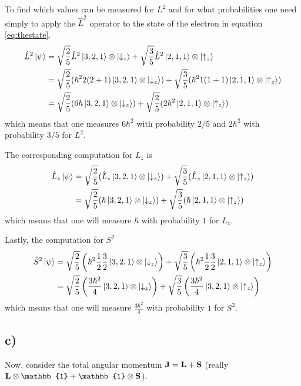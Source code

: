 \documentclass[]{article}
\begin{document}
To find which values can be measured for $L^2$ and for what probabilities one need simply to apply the $\hat{L}^2$ operator to the state of the electron in equation \ref{eq:thestate}.
\begin{align*}
\hat{L}^2\ket{\psi}
&=\sqrt{\frac{2}{5}}\hat{L}^2\ket{3,2,1}\otimes\ket{\downarrow_z}
+ \sqrt{\frac{3}{5}}\hat{L}^2\ket{2,1,1}\otimes\ket{\uparrow_z} \\
&=\sqrt{\frac{2}{5}}(\hbar^22(2+1)\ket{3,2,1}\otimes\ket{\downarrow_z})
+ \sqrt{\frac{3}{5}}(\hbar^21(1+1)\ket{2,1,1}\otimes\ket{\uparrow_z}) \\
&=\sqrt{\frac{2}{5}}(6\hbar\ket{3,2,1}\otimes\ket{\downarrow_z})
+ \sqrt{\frac{2}{5}}(2\hbar^2\ket{2,1,1}\otimes\ket{\uparrow_z})
\end{align*}
which means that one measures $6\hbar^2$ with probability $2/5$ and $2\hbar^2$ with probability $3/5$ for $L^2$. 

The corresponding computation for $L_z$ is
\begin{align*}
\hat{L}_z\ket{\psi}
&=\sqrt{\frac{2}{5}}(\hat{L}_z\ket{3,2,1}\otimes\ket{\downarrow_z})
+ \sqrt{\frac{3}{5}}(\hat{L}_z\ket{2,1,1}\otimes\ket{\uparrow_z}) \\
&=\sqrt{\frac{2}{5}}(\hbar\ket{3,2,1}\otimes\ket{\downarrow_z})
+ \sqrt{\frac{3}{5}}(\hbar\ket{2,1,1}\otimes\ket{\uparrow_z}) \\
\end{align*}
which means that one will measure $\hbar$ with probability $1$ for $L_z$.

Lastly, the computation for $S^2$
\begin{align*}
\hat{S}^2\ket{\psi} 
&=\sqrt{\frac{2}{5}}\left(\hbar^2\frac{1}{2}\frac{3}{2}\ket{3,2,1}\otimes\ket{\downarrow_z}\right)
+ \sqrt{\frac{3}{5}}\left(\hbar^2\frac{1}{2}\frac{3}{2}\ket{2,1,1}\otimes\ket{\uparrow_z}\right)\\
&=\sqrt{\frac{2}{5}}\left(\frac{3\hbar^2}{4}\ket{3,2,1}\otimes\ket{\downarrow_z}\right)
+ \sqrt{\frac{3}{5}}\left(\frac{3\hbar^2}{4}\ket{3,2,1}\otimes\ket{\uparrow_z}\right)
\end{align*}
which means that one will measure $\frac{3\hbar^2}{4}$ with probability $1$ for $S^2$.

\subsection*{c)}
Now, consider the total angular momentum $\vb{J}=\vb{L}+\vb{S}$ (really $\vb{L}\otimes \mathbb{1} + \mathbb{1} \otimes\vb{S}$).
\end{document}
